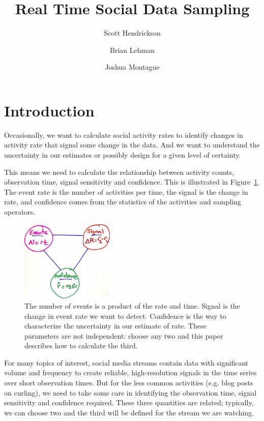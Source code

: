 \documentclass{article}
\title{Real Time Social Data Sampling }
\author[]{Scott Hendrickson}
\author[]{Brian Lehman}
\author[]{Joshua Montague}
\affil[]{ \Large{Gnip, Inc.} }
\begin{document}
\maketitle

\section{Introduction}

Occasionally, we want to calculate social activity rates to identify changes in activity rate that signal some change in the data.  And we want to
understand the uncertainty in our estimates or possibly design for a given level of certainty.

This means we need to calculate the relationship between activity counts, observation time, signal sensitivity and confidence. This is illustrated in Figure~\ref{fig:tradeoff}. The event rate is the number of activities per time, the signal is the change in rate, and confidence comes from the statistics of the activities and sampling operators.

%
\begin{figure}[h]
	\begin{center}
		\includegraphics[width=1.75in]{./imgs/tradeoff.jpg}
	\end{center}
	\caption{The number of events is a product of the rate and time. Signal is the change in event rate we want to detect.  Confidence is the way to characterize the uncertainty in our estimate of rate. These parameters are not independent: choose any two and this paper describes how to calculate the third. }
    	\label{fig:tradeoff}
\end{figure}
%
%

For many topics of interest, social media streams contain data with significant volume and frequency to create reliable, high-resolution signals in the time series over short observation times.  But for the less common activities (e.g. blog posts on curling), we need to take some care in identifying the observation time, signal sensitivity and confidence required. These three quantities are related; typically, we can choose two and the third will be defined for the stream we are watching.
\end{document}
